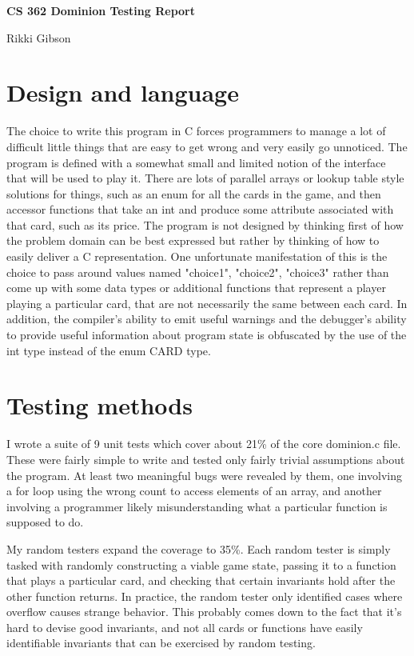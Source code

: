 \documentclass[11pt]{article}
\begin{document}
\Large\textbf{CS 362 Dominion Testing Report}

\large{Rikki Gibson}
\normalsize

\bigskip
\section{Design and language}
The choice to write this program in C forces programmers to manage a lot of difficult little things that are easy to get wrong and very easily go unnoticed. The program is defined with a somewhat small and limited notion of the interface that will be used to play it. There are lots of parallel arrays or lookup table style solutions for things, such as an enum for all the cards in the game, and then accessor functions that take an int and produce some attribute associated with that card, such as its price. The program is not designed by thinking first of how the problem domain can be best expressed but rather by thinking of how to easily deliver a C representation. One unfortunate manifestation of this is the choice to pass around values named "choice1", "choice2", "choice3" rather than come up with some data types or additional functions that represent a player playing a particular card, that are not necessarily the same between each card. In addition, the compiler's ability to emit useful warnings and the debugger's ability to provide useful information about program state is obfuscated by the use of the int type instead of the enum CARD type.

\section{Testing methods}
I wrote a suite of 9 unit tests which cover about 21\% of the core dominion.c file. These were fairly simple to write and tested only fairly trivial assumptions about the program. At least two meaningful bugs were revealed by them, one involving a for loop using the wrong count to access elements of an array, and another involving a programmer likely misunderstanding what a particular function is supposed to do.

My random testers expand the coverage to 35\%. Each random tester is simply tasked with randomly constructing a viable game state, passing it to a function that plays a particular card, and checking that certain invariants hold after the other function returns. In practice, the random tester only identified cases where overflow causes strange behavior. This probably comes down to the fact that it's hard to devise good invariants, and not all cards or functions have easily identifiable invariants that can be exercised by random testing.
\end{document}
